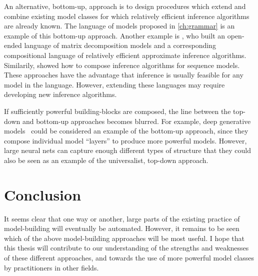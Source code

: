 An alternative, bottom-up, approach is to design procedures which extend and combine existing model classes for which relatively efficient inference algorithms are already known.
The language of models proposed in \cref{ch:grammar} is an example of this bottom-up approach.
Another example is \citet{roger-grosse-thesis}, who built an open-ended language of matrix decomposition models and a corresponding compositional language of relatively efficient approximate inference algorithms.
Similarily, \citet{christian-thesis} showed how to compose inference algorithms for sequence models.
These approaches have the advantage that inference is usually feasible for any model in the language.
However, extending these languages may require developing new inference algorithms.

If sufficiently powerful building-blocks are composed, the line between the top-down and bottom-up approaches becomes blurred.
For example, deep generative models~\citep{adams2010learning,damianou2012deep,rippel2013high,bengio2013generalized,salakhutdinov2009deep} could be considered an example of the bottom-up approach, since they compose individual model ``layers'' to produce more powerful models.
However, large neural nets can capture enough different types of structure that they could also be seen as an example of the universalist, top-down approach.

\section{Conclusion}
It seems clear that one way or another, large parts of the existing practice of model-building will eventually be automated.
However, it remains to be seen which of the above model-building approaches will be most useful.
I hope that this thesis will contribute to our understanding of the strengths and weaknesses of these different approaches, and towards the use of more powerful model classes by practitioners in other fields.






